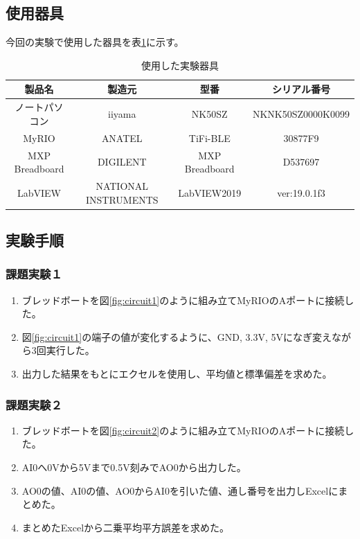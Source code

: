 \documentclass[11pt,dvipdfmx]{jarticle}
\begin{document}
\subsection{使用器具}
今回の実験で使用した器具を表\ref{tab:tools}に示す。
\begin{table}[hbtp]
	\caption{使用した実験器具}
	\label{tab:tools}
	\centering
	\begin{tabular}{|c|c|c|c|}
		\hline
		製品名　& 製造元　& 型番 & シリアル番号\\
		\hline \hline
		ノートパソコン & iiyama &NK50SZ& NKNK50SZ0000K0099\\
		\hline
		MyRIO & ANATEL &TiFi-BLE& 30877F9\\
		\hline
		MXP Breadboard & DIGILENT &MXP Breadboard& D537697\\
		\hline
		LabVIEW & NATIONAL INSTRUMENTS &LabVIEW2019& ver:19.0.1f3\\
		\hline
	\end{tabular}
	
\end{table}

\subsection{実験手順}
	\subsubsection{課題実験１}
		\begin{enumerate}
			\item ブレッドボートを図\ref{fig:circuit1}のように組み立てMyRIOのAポートに接続した。
			\item 図\ref{fig:circuit1}の端子の値が変化するように、GND, 3.3V, 5Vになぎ変えながら3回実行した。
			\item 出力した結果をもとにエクセルを使用し、平均値と標準偏差を求めた。
		\end{enumerate}

	\subsubsection{課題実験２}
		\begin{enumerate}
			\item ブレッドボートを図\ref{fig:circuit2}のように組み立てMyRIOのAポートに接続した。
			\item AI0へ0Vから5Vまで0.5V刻みでAO0から出力した。
			\item AO0の値、AI0の値、AO0からAI0を引いた値、通し番号を出力しExcelにまとめた。
			\item まとめたExcelから二乗平均平方誤差を求めた。
		\end{enumerate}
		
\end{document}
